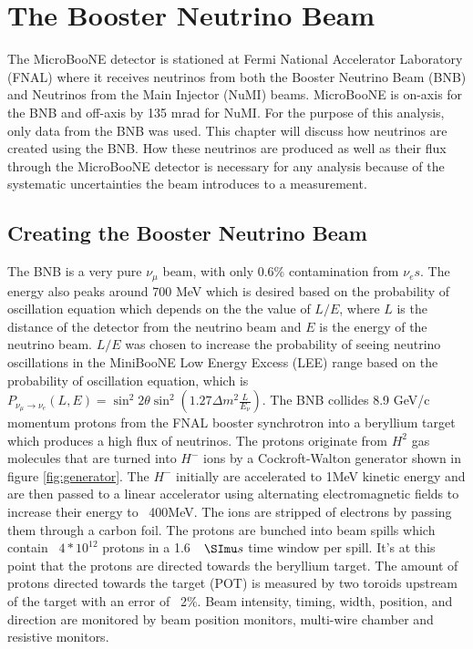 \chapter{The Booster Neutrino Beam}\label{ch:beam}

The MicroBooNE detector is stationed at Fermi National Accelerator Laboratory (FNAL) where it receives neutrinos from both the Booster Neutrino Beam (BNB) and Neutrinos from the Main Injector (NuMI) beams. MicroBooNE is on-axis for the BNB and off-axis by 135 mrad for NuMI. For the purpose of this analysis, only data from the BNB was used. This chapter will discuss how neutrinos are created using the BNB. How these neutrinos are produced as well as their flux through the MicroBooNE detector is necessary for any analysis because of the systematic uncertainties the beam introduces to a measurement.

\section{Creating the Booster Neutrino Beam}
The BNB is a very pure $\nu_{\mu}$ beam, with only 0.6\% contamination from $\nu_{e}s$. The energy also peaks around 700 MeV which is desired based on the probability of oscillation equation which depends on the the value of $L/E$, where $L$ is the distance of the detector from the neutrino beam and $E$ is the energy of the neutrino beam. $L/E$ was chosen to increase the probability of seeing neutrino oscillations in the MiniBooNE Low Energy Excess (LEE) range based on the probability of oscillation equation, which is $ P_{\nu_{\mu}\rightarrow \nu_{e}}\left(L,E\right) = \sin^2 2\theta \sin^2 \left(1.27\Delta m^2 \frac{L}{E_{\nu}}\right)$. The BNB collides 8.9 GeV/c momentum protons from the FNAL booster synchrotron into a beryllium target which produces a high flux of neutrinos. The protons originate from $H^2$ gas molecules that are turned into $H^-$ ions by a Cockroft-Walton generator shown in figure \ref{fig:generator}. The $H^-$ initially are accelerated to 1MeV kinetic energy and are then passed to a linear accelerator using alternating electromagnetic fields to increase their energy to ~400MeV. The ions are stripped of electrons by passing them through a carbon foil. The protons are bunched into beam spills which contain ~$4*10^12$ protons in a 1.6 $\micro s$ time window per spill. It's at this point that the protons are directed towards the beryllium target. The amount of protons directed towards the target (POT) is measured by two toroids upstream of the target with an error of ~2$\%$. Beam intensity, timing, width, position, and direction are monitored by beam position monitors, multi-wire chamber and resistive monitors.    





